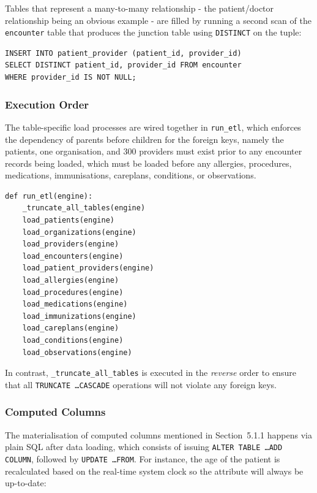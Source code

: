 Tables that represent a many-to-many relationship - the patient/doctor relationship being an obvious example - are filled by running a second scan of the \texttt{encounter} table that produces the junction table using \texttt{DISTINCT} on the tuple:

\begin{lstlisting}[style=sqlstyle]
INSERT INTO patient_provider (patient_id, provider_id)
SELECT DISTINCT patient_id, provider_id FROM encounter
WHERE provider_id IS NOT NULL;
\end{lstlisting}

\subsubsection*{Execution Order}

The table-specific load processes are wired together in \texttt{run\_etl}, which enforces the dependency of parents before children for the foreign keys, namely the patients, one organisation, and 300 providers must exist prior to any encounter records being loaded, which must be loaded before any allergies, procedures, medications, immunisations, careplans, conditions, or observations.

\begin{lstlisting}[style=pythonstyle]
def run_etl(engine):
    _truncate_all_tables(engine)
    load_patients(engine)
    load_organizations(engine)
    load_providers(engine)
    load_encounters(engine)
    load_patient_providers(engine)
    load_allergies(engine)
    load_procedures(engine)
    load_medications(engine)
    load_immunizations(engine)
    load_careplans(engine)
    load_conditions(engine)
    load_observations(engine)
\end{lstlisting}

In contrast, \texttt{\_truncate\_all\_tables} is executed in the \emph{reverse} order to ensure that all \texttt{TRUNCATE \dots CASCADE} operations will not violate any foreign keys.

\subsubsection*{Computed Columns}

The materialisation of computed columns mentioned in Section~5.1.1 happens via plain SQL after data loading, which consists of issuing \texttt{ALTER TABLE \dots ADD COLUMN}, followed by \texttt{UPDATE \dots FROM}. For instance, the age of the patient is recalculated based on the real-time system clock so the attribute will always be up-to-date:

